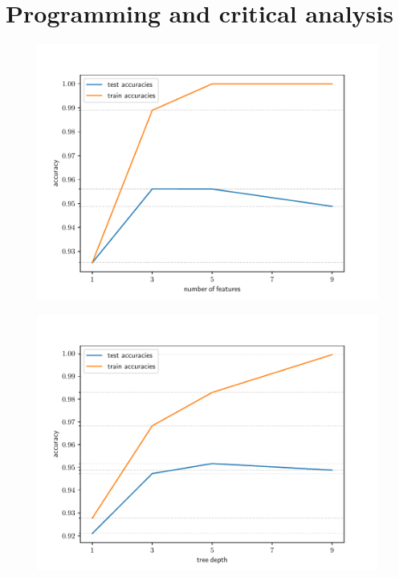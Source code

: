 \documentclass{exam}
\begin{document}
    \section{Programming and critical analysis}
    \begin{questions}
        \setcounter{question}{4}
        \item
        \begin{parts}
            \item { \quad}
            \vspace{-3.2em}
            \begin{figure}[H]
                \centering
                {\includegraphics[scale = 0.60]{accuracy_n_features.pdf} }
            \end{figure}
            \item  {\quad}
            \vspace{-3.2em}
            \begin{figure}[H]
                \centering
                {\includegraphics[scale = 0.60]{accuracy_n_tree_depths.pdf} }

\end{figure}
\end{parts}
\end{questions}
\end{document}
